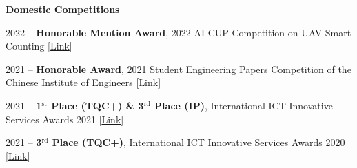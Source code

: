  \resumeItemListEnd

\vspace{0.5mm}
\noindent \textbf{\large Domestic Competitions}
\vspace{-2.5mm}

\resumeItemListStart
    \item{
        2022 -- \textbf{Honorable Mention Award}, 2022 AI CUP Competition on UAV Smart Counting
        {\color{Blue}[\href{https://global.turingcerts.com/en/co/cert?hash=3e49cd4e1c3bf7628f2cc9f15499e9a4da9b9cc3501d16f7dcb2a98fd2349023}{Link}]}
    }
    \item{
        2021 -- \textbf{Honorable Award}, 2021 Student Engineering Papers Competition of the Chinese Institute of Engineers
        {\color{Blue}[\href{https://leohuang0511.github.io/assets/certificates/domestic/2021_CIE_Student_Engineering_Papers_Competition.pdf}{Link}]}
    }
    \item{
        2021 -- \textbf{1$^{\text{st}}$ Place (TQC+) \& 3$^{\text{rd}}$ Place (IP)}, International ICT Innovative Services Awards 2021
        {\color{Blue}[\href{https://leohuang0511.github.io/assets/certificates/domestic/2021_InnoServe_IP.pdf}{Link}]}
    }
    \item{
        2021 -- \textbf{3$^{\text{rd}}$ Place (TQC+)}, International ICT Innovative Services Awards 2020
        {\color{Blue}[\href{https://leohuang0511.github.io/assets/certificates/domestic/2020_InnoServe_TQC+.pdf}{Link}]}
    }

 \resumeItemListEnd

 \vspace{-6pt}
 